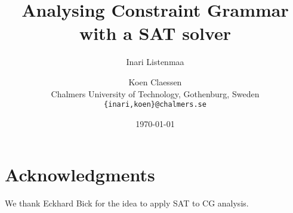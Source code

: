 \documentclass[11pt]{article}
\title{Analysing Constraint Grammar with a SAT solver}
\author{Inari Listenmaa \and Koen Claessen \\
 Chalmers University of Technology, Gothenburg, Sweden \\
 {\tt \{inari,koen\}@chalmers.se} }
\date{\today}
\begin{document}
\maketitle







\section*{Acknowledgments}
We thank Eckhard Bick for the idea to apply SAT to CG analysis. 




\end{document}
